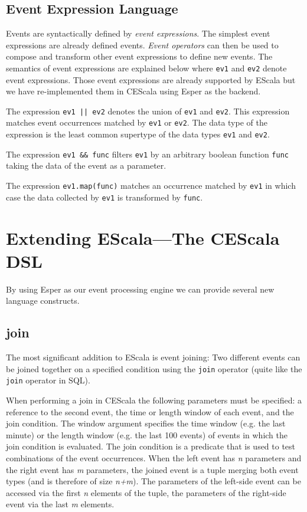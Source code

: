\documentclass[book,type=bsc,colorback,accentcolor=tud8b,12pt,twoside]{tudthesis}
\begin{document}
\subsection{Event Expression Language}
\label{sec:event-expr-lang}

Events are syntactically defined by \emph{event expressions}.  The simplest event expressions are already defined events.  \emph{Event operators} can then be used to compose and transform other event expressions to define new events.  The semantics of event expressions are explained below where \mbox{\texttt{ev1}} and \mbox{\texttt{ev2}} denote event expressions.  Those event expressions are already supported by EScala but we have re-implemented them in CEScala using Esper as the backend.  

The expression \mbox{\texttt{ev1 || ev2}} denotes the union of \mbox{\texttt{ev1}} and \mbox{\texttt{ev2}}.  This expression matches event occurrences matched by \mbox{\texttt{ev1}} or \mbox{\texttt{ev2}}.  The data type of the expression is the least common supertype of the data types \mbox{\texttt{ev1}} and \mbox{\texttt{ev2}}.  

The expression \mbox{\texttt{ev1 \&\& func}} filters \mbox{\texttt{ev1}} by an arbitrary boolean function \mbox{\texttt{func}} taking the data of the event as a parameter.

The expression \mbox{\texttt{ev1.map(func)}} matches an occurrence matched by \mbox{\texttt{ev1}} in which case the data collected by \mbox{\texttt{ev1}} is transformed by \mbox{\texttt{func}}.

\section{Extending EScala---The CEScala DSL}
\label{sec:the-cescala-dsl}

By using Esper as our event processing engine we can provide several new language constructs.

\subsection{join}
\label{sec:join}

The most significant addition to EScala is event joining: Two different events can be joined together on a specified condition using the \mbox{\texttt{join}} operator (quite like the \mbox{\texttt{join}} operator in SQL).  

When performing a join in CEScala the following parameters must be specified: a reference to the second event, the time or length window of each event, and the join condition.  The window argument specifies the time window (e.g. the last minute) or the length window (e.g. the last 100 events) of events in which the join condition is evaluated.  The join condition is a predicate that is used to test combinations of the event occurrences.  When the left event has \emph{n} parameters and the right event has \emph{m} parameters, the joined event is a tuple merging both event types (and is therefore of size \emph{n+m}).  The parameters of the left-side event can be accessed via the first \emph{n} elements of the tuple, the parameters of the right-side event via the last \emph{m} elements.  
\end{document}
